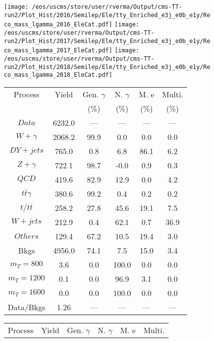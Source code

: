 \begin{figure}
\centering
\texttt{[image: /eos/uscms/store/user/rverma/Output/cms-TT-run2/Plot\_Hist/2016/Semilep/Ele/tty\_Enriched\_e3j\_e0b\_e1y/Reco\_mass\_lgamma\_2016\_EleCat.pdf]}
\texttt{[image: /eos/uscms/store/user/rverma/Output/cms-TT-run2/Plot\_Hist/2017/Semilep/Ele/tty\_Enriched\_e3j\_e0b\_e1y/Reco\_mass\_lgamma\_2017\_EleCat.pdf]}
\texttt{[image: /eos/uscms/store/user/rverma/Output/cms-TT-run2/Plot\_Hist/2018/Semilep/Ele/tty\_Enriched\_e3j\_e0b\_e1y/Reco\_mass\_lgamma\_2018\_EleCat.pdf]}
\begin{minipage}[c]{0.32\textwidth}
\centering
\tiny{
\begin{tabular}{cccccc}
\hline
Process & Yield & Gen. $\gamma$ & N. $\gamma$ & M. e & Multi. \\
 &  & (\%) & (\%) & (\%) & (\%)  \\
\hline
                                                                      $ Data $ &  6232.0 &  --- &  --- &  --- &  ---\\
$ W+\gamma $ &  2068.2 &  99.9 &  0.0 &  0.0 &  0.0\\
$ DY+jets $ &  765.0 &  0.8 &  6.8 &  86.1 &  6.2\\
$ Z+\gamma $ &  722.1 &  98.7 &  -0.0 &  0.9 &  0.3\\
$ QCD $ &  419.6 &  82.9 &  12.9 &  0.0 &  4.2\\
$ t\bar{t}\gamma $ &  380.6 &  99.2 &  0.4 &  0.2 &  0.2\\
$ t/t\bar{t} $ &  258.2 &  27.8 &  45.6 &  19.1 &  7.5\\
$ W+jets $ &  212.9 &  0.4 &  62.1 &  0.7 &  36.9\\
$ Others $ &  129.4 &  67.2 &  10.5 &  19.4 &  3.0\\
Bkgs &  4956.0 &  74.1 &  7.5 &  15.0 &  3.4\\
$ m_{T} = 800 $ &  3.6 &  0.0 &  100.0 &  0.0 &  0.0\\
$ m_{T} = 1200 $ &  0.1 &  0.0 &  96.9 &  3.1 &  0.0\\
$ m_{T} = 1600 $ &  0.0 &  0.0 &  100.0 &  0.0 &  0.0\\
Data/Bkgs &  1.26 &  --- &  --- &  --- &  ---\\
\hline
\end{tabular}
}
\end{minipage}
\begin{minipage}[c]{0.32\textwidth}
\centering
\tiny{
\begin{tabular}{cccccc}
\hline
Process & Yield & Gen. $\gamma$ & N. $\gamma$ & M. e & Multi. \\

\end{tabular}}
\end{minipage}
\end{figure}
